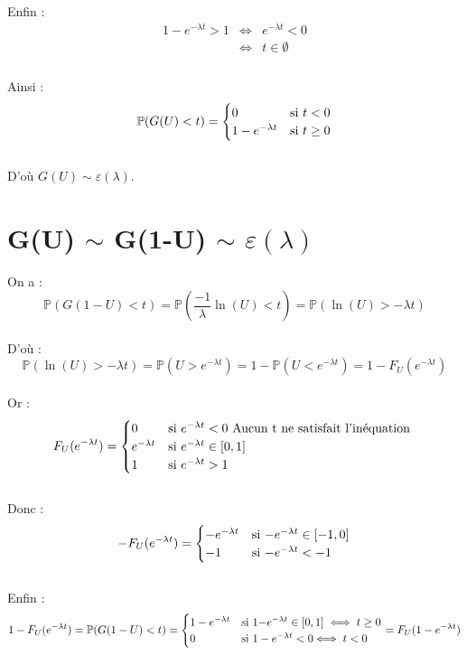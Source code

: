 \documentclass[12,french]{report}
\begin{document}
Enfin :
$$\begin{array}{ccl}
	1-e^{-\lambda t}>1 & \iff & e^{-\lambda t}<0 \\
	& \iff & t\in\emptyset \\
  \end{array}$$\\
  
Ainsi :
$$\mathbb{P}(G(U)<t)=\begin{cases}
0 & \text{si \ensuremath{t<0}}\\
1-e^{-\lambda t} & \text{si }t\geq0
\end{cases}$$\\

D'où $G(U) \sim \varepsilon(\lambda)$.
 
\chapter{G(U) $\sim$ G(1-U) $\sim$ $\varepsilon(\lambda)$}

On a :
$$\mathbb{P}(G(1-U)<t)=\mathbb{P}(\frac{-1}{\lambda}\ln(U)<t)=\mathbb{P}(\ln(U)>-\lambda t)$$\\
D'où : $$\mathbb{P}(\ln(U)>-\lambda t)=\mathbb{P}(U>e^{-\lambda t})=1-\mathbb{P}(U<e^{-\lambda t})=1-F_{U}(e^{-\lambda t})$$\\

Or : $$F_{U}(e^{-\lambda t})=\begin{cases}
0 & \text{si \ensuremath{e^{-\lambda t}<0}}\text{ Aucun t ne satisfait l'inéquation }\\
e^{-\lambda t} & \text{si \ensuremath{e^{-\lambda t}}}\in[0,1]\\
1 & \text{si \ensuremath{e^{-\lambda t}>1}}
\end{cases}$$\\
Donc :
$$-F_{U}(e^{-\lambda t})=\begin{cases}
-e^{-\lambda t} & \text{si \ensuremath{-}\ensuremath{e^{-\lambda t}}}\in[-1,0]\\
-1 & \text{si \ensuremath{-e^{-\lambda t}<-1}}
\end{cases}$$\\
Enfin :
$$1-F_{U}(e^{-\lambda t})=\mathbb{P}(G(1-U)<t)=\begin{cases}
1-e^{-\lambda t} & \text{si \ensuremath{1-}\ensuremath{e^{-\lambda t}}}\in[0,1]\iff t\geq0\\
0 & \text{si \ensuremath{1-e^{-\lambda t}<0}\ensuremath{\iff t<0}}
\end{cases}=F_{U}(1-e^{-\lambda t})$$\\
\end{document}

